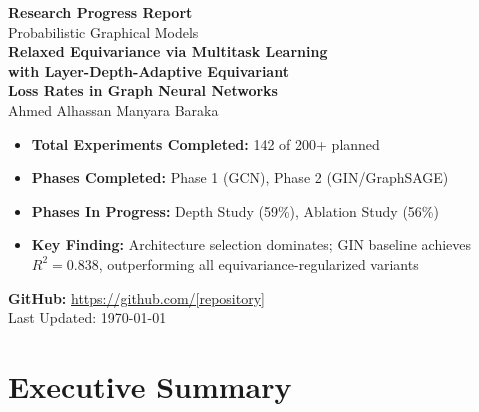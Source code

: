 \documentclass[11pt,a4paper]{article}
\begin{document}
\begin{titlepage}
    \centering
    \vspace*{2cm}
    
    {\LARGE\textbf{Research Progress Report}}\\[0.5cm]
    {\Large Probabilistic Graphical Models }\\[2cm]
    
    {\Huge\textbf{Relaxed Equivariance via Multitask Learning}}\\[0.3cm]
    {\Huge\textbf{with Layer-Depth-Adaptive Equivariant}}\\[0.3cm]
    {\Huge\textbf{Loss Rates in Graph Neural Networks}}\\[2cm]
    
    {\large Ahmed Alhassan \quad Manyara Baraka }\\[2cm]
    
    \begin{tcolorbox}[colback=blue!5!white,colframe=blue!75!black,title=\textbf{Progress Summary}]
    \begin{itemize}[leftmargin=*]
        \item \textbf{Total Experiments Completed:} 142 of 200+ planned
        \item \textbf{Phases Completed:} Phase 1 (GCN), Phase 2 (GIN/GraphSAGE)
        \item \textbf{Phases In Progress:} Depth Study (59\%), Ablation Study (56\%)
        \item \textbf{Key Finding:} Architecture selection dominates; GIN baseline achieves $R^2=0.838$, outperforming all equivariance-regularized variants
    \end{itemize}
    \end{tcolorbox}
    
    \vfill
    
    {\large\textbf{GitHub:} \url{https://github.com/[repository]}}\\[0.5cm]
    {\large Last Updated: \today}
    
\end{titlepage}

\tableofcontents
\newpage

\section{Executive Summary}
\end{document}
